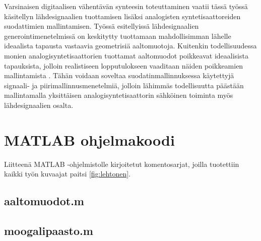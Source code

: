 \documentclass[finnish,12pt,a4paper,pdftex]{article} %
\begin{document}
Varsinaisen digitaalisen vähentävän synteesin toteuttaminen vaatii tässä työssä käsitellyn lähdesignaalien tuottamisen lisäksi analogisten syntetisaattoreiden suodattimien mallintamisen. Työssä esitellyissä lähdesignaalien generointimenetelmissä on keskitytty tuottamaan mahdollisimman lähelle ideaalista tapausta vastaavia geometrisiä aaltomuotoja. Kuitenkin todellisuudessa monien analogisyntetisaattorien tuottamat aaltomuodot poikkeavat ideaalisista tapauksista, jolloin realistiseen lopputulokseen vaaditaan näiden poikkeamien mallintamista \cite{Pekonen2011}. Tähän voidaan soveltaa suodatinmallinnuksessa käytettyjä signaali- ja piirimallinnusmenetelmiä, jolloin lähimmäs todellisuutta päästään mallintamalla yksittäisen analogisyntetisaattorin sähköinen toiminta myös lähdesignaalien osalta. \cite{Historia}

\clearpage


{}




\nocite{Sanasto}


\clearpage
\appendix
{}

\section{MATLAB ohjelmakoodi} \label{sec:matlab}

Liitteenä MATLAB -ohjelmistolle kirjoitetut komentosarjat, joilla tuotettiin kaikki työn kuvaajat paitsi \ref{fig:lehtonen}.

\lstset{basicstyle=\tiny} %

\subsection*{aaltomuodot.m}
\vspace{-5mm}

\vspace{6mm}
\subsection*{moogalipaasto.m}
\vspace{-5mm}

\vspace{6mm}
\end{document}
